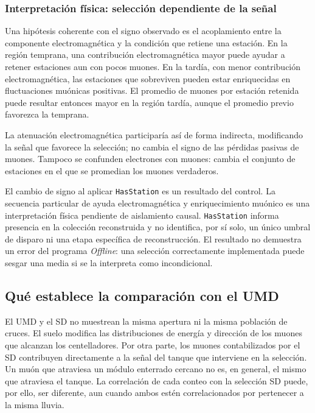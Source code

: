 \subsubsection{Interpretación física: selección dependiente de la señal}

Una hipótesis coherente con el signo observado es el acoplamiento entre la componente electromagnética y la condición que retiene una estación. En la región temprana, una contribución electromagnética mayor puede ayudar a retener estaciones aun con pocos muones. En la tardía, con menor contribución electromagnética, las estaciones que sobreviven pueden estar enriquecidas en fluctuaciones muónicas positivas. El promedio de muones por estación retenida puede resultar entonces mayor en la región tardía, aunque el promedio previo favorezca la temprana.

La atenuación electromagnética participaría así de forma indirecta, modificando la señal que favorece la selección; no cambia el signo de las pérdidas pasivas de muones. Tampoco se confunden electrones con muones: cambia el conjunto de estaciones en el que se promedian los muones verdaderos.

El cambio de signo al aplicar \texttt{HasStation} es un resultado del control. La secuencia particular de ayuda electromagnética y enriquecimiento muónico es una interpretación física pendiente de aislamiento causal. \texttt{HasStation} informa presencia en la colección reconstruida y no identifica, por sí solo, un único umbral de disparo ni una etapa específica de reconstrucción. El resultado no demuestra un error del programa \textit{Offline}: una selección correctamente implementada puede sesgar una media si se la interpreta como incondicional.

\subsection{Qué establece la comparación con el UMD}
\label{subsec:umd_poblacion_seleccion}

El UMD y el SD no muestrean la misma apertura ni la misma población de cruces. El suelo modifica las distribuciones de energía y dirección de los muones que alcanzan los centelladores. Por otra parte, los muones contabilizados por el SD contribuyen directamente a la señal del tanque que interviene en la selección. Un muón que atraviesa un módulo enterrado cercano no es, en general, el mismo que atraviesa el tanque. La correlación de cada conteo con la selección SD puede, por ello, ser diferente, aun cuando ambos estén correlacionados por pertenecer a la misma lluvia.

